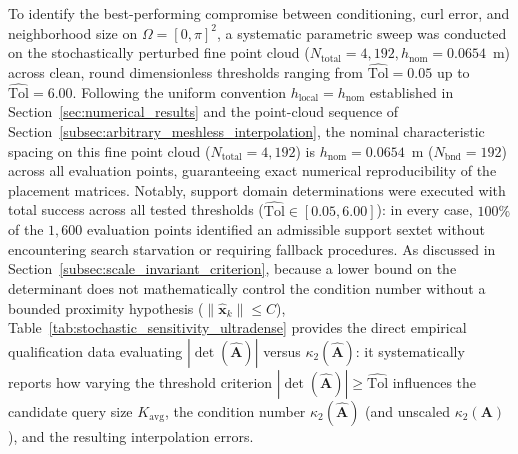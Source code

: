 \documentclass[preprint,12pt]{elsarticle}
\begin{document}
To identify the best-performing compromise between conditioning, curl error, and neighborhood size on $\Omega = [0, \pi]^2$, a systematic parametric sweep was conducted on the stochastically perturbed fine point cloud ($N_{\mathrm{total}} = 4{,}192, h_{\mathrm{nom}} = 0.0654$~m) across clean, round dimensionless thresholds ranging from $\widehat{\mathrm{Tol}} = 0.05$ up to $\widehat{\mathrm{Tol}} = 6.00$. Following the uniform convention $h_{\mathrm{local}} = h_{\mathrm{nom}}$ established in Section~\ref{sec:numerical_results} and the point-cloud sequence of Section~\ref{subsec:arbitrary_meshless_interpolation}, the nominal characteristic spacing on this fine point cloud ($N_{\mathrm{total}} = 4{,}192$) is $h_{\mathrm{nom}} = 0.0654$~m ($N_{\mathrm{bnd}} = 192$) across all evaluation points, guaranteeing exact numerical reproducibility of the placement matrices. Notably, support domain determinations were executed with total success across all tested thresholds ($\widehat{\mathrm{Tol}} \in [0.05, 6.00]$): in every case, $100\%$ of the $1{,}600$ evaluation points identified an admissible support sextet without encountering search starvation or requiring fallback procedures. As discussed in Section~\ref{subsec:scale_invariant_criterion}, because a lower bound on the determinant does not mathematically control the condition number without a bounded proximity hypothesis ($\|\hat{\mathbf{x}}_k\| \le C$), Table~\ref{tab:stochastic_sensitivity_ultradense} provides the direct empirical qualification data evaluating $|\det(\widehat{\mathbf{A}})|$ versus $\kappa_2(\widehat{\mathbf{A}})$: it systematically reports how varying the threshold criterion $|\det(\widehat{\mathbf{A}})| \ge \widehat{\mathrm{Tol}}$ influences the candidate query size $K_{\mathrm{avg}}$, the condition number $\kappa_2(\widehat{\mathbf{A}})$ (and unscaled $\kappa_2(\mathbf{A})$), and the resulting interpolation errors.
\end{document}
